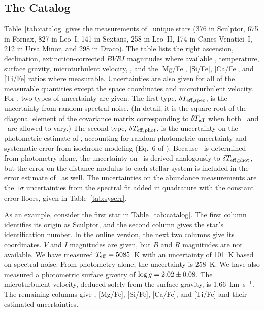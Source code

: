 \documentclass{emulateapj}
\begin{document}
\subsection{The Catalog}
\label{sec:catalog}

Table~\ref{tab:catalog} gives the measurements of \ndsphstars\ unique
stars (376 in Sculptor, 675 in Fornax, 827 in Leo~I, 141 in Sextans,
258 in Leo~II, 174 in Canes Venatici~I, 212 in Ursa Minor, and 298 in
Draco).  The table lists the right ascension, declination,
extinction-corrected $BVRI$ magnitudes where available
\citep[sometimes converted from $ugriz$ following][]{jor06},
temperature, surface gravity, microturbulent velocity, \feh, and the
[Mg/Fe], [Si/Fe], [Ca/Fe], and [Ti/Fe] ratios where measurable.
Uncertainties are also given for all of the measurable quantities
except the space coordinates and microturbulent velocity.  For \teff,
two types of uncertainty are given.  The first type, $\delta
T_{\rm{eff,spec}}$, is the uncertainty from random spectral noise.
(In detail, it is the square root of the diagonal element of the
covariance matrix corresponding to $\delta T_{\rm eff}$ when both
\teff\ and \feh\ are allowed to vary.)  The second type, $\delta
T_{\rm{eff,phot}}$, is the uncertainty on the photometric estimate of
\teff, accounting for random photometric uncertainty and systematic
error from isochrone modeling (Eq.~6 of \citeauthor*{kir09}).  Because
\logg\ is determined from photometry alone, the uncertainty on
\logg\ is derived analogously to $\delta T_{\rm{eff,phot}}$, but the
error on the distance modulus to each stellar system is included in
the error estimate of \logg\ as well.  The uncertainties on the
abundance measurements are the $1 \sigma$ uncertainties from the
spectral fit added in quadrature with the constant error floors, given
in Table~\ref{tab:syserr}.

As an example, consider the first star in Table~\ref{tab:catalog}.
The first column identifies its origin as Sculptor, and the second
column gives the star's identification number.  In the online version,
the next two columns give its coordinates.  $V$ and $I$ magnitudes are
given, but $B$ and $R$ magnitudes are not available.  We have measured
$T_{\rm eff} = 5085$~K with an uncertainty of 101~K based on spectral
noise.  From photometry alone, the uncertainty is 258~K.  We have also
measured a photometric surface gravity of $\log g = 2.02 \pm 0.08$.
The microturbulent velocity, deduced solely from the surface gravity,
is 1.66~km~s$^{-1}$.  The remaining columns give \feh, [Mg/Fe],
[Si/Fe], [Ca/Fe], and [Ti/Fe] and their estimated uncertainties.
\end{document}
